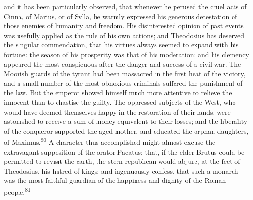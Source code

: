 and it has been particularly observed, that whenever he perused
the cruel acts of Cinna, of Marius, or of Sylla, he warmly
expressed his generous detestation of those enemies of humanity
and freedom. His disinterested opinion of past events was
usefully applied as the rule of his own actions; and Theodosius
has deserved the singular commendation, that his virtues always
seemed to expand with his fortune: the season of his prosperity
was that of his moderation; and his clemency appeared the most
conspicuous after the danger and success of a civil war. The
Moorish guards of the tyrant had been massacred in the first heat
of the victory, and a small number of the most obnoxious
criminals suffered the punishment of the law. But the emperor
showed himself much more attentive to relieve the innocent than
to chastise the guilty. The oppressed subjects of the West, who
would have deemed themselves happy in the restoration of their
lands, were astonished to receive a sum of money equivalent to
their losses; and the liberality of the conqueror supported the
aged mother, and educated the orphan daughters, of Maximus.\textsuperscript{80} A
character thus accomplished might almost excuse the extravagant
supposition of the orator Pacatus; that, if the elder Brutus
could be permitted to revisit the earth, the stern republican
would abjure, at the feet of Theodosius, his hatred of kings; and
ingenuously confess, that such a monarch was the most faithful
guardian of the happiness and dignity of the Roman people.\textsuperscript{81}






